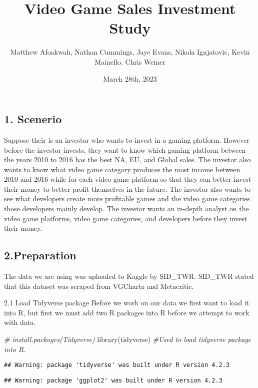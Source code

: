 \documentclass[
]{article}
\title{Video Game Sales Investment Study}
\author{Matthew Afoakwah, Nathan Cummings, Jaye Evans, Nikola
Ignjatovic, Kevin Mainello, Chris Weiner}
\date{March 28th, 2023}
\newenvironment{Shaded}{\begin{snugshade}}{\end{snugshade}}
\newcommand{\CommentTok}[1]{\textcolor[rgb]{0.56,0.35,0.01}{\textit{#1}}}
\newcommand{\FunctionTok}[1]{\textcolor[rgb]{0.00,0.00,0.00}{#1}}
\newcommand{\NormalTok}[1]{#1}
\begin{document}
\maketitle

\hypertarget{scenerio}{%
\subsection{1. Scenerio}\label{scenerio}}

Suppose their is an investor who wants to invest in a gaming platform.
However before the investor invests, they want to know which gaming
platform between the years 2010 to 2016 has the best NA, EU, and Global
sales. The investor also wants to know what video game category produces
the most income between 2010 and 2016 while for each video game platform
so that they can better invest their money to better profit themselves
in the future. The investor also wants to see what developers create
more profitable games and the video game categories those developers
mainly develop. The investor wants an in-depth analyst on the video game
platforms, video game categories, and developers before they invest
their money.

\hypertarget{preparation}{%
\subsection{2.Preparation}\label{preparation}}

The data we are using was uploaded to Kaggle by SID\_TWR. SID\_TWR
stated that this dataset was scraped from VGChartz and Metacritic.

2.1 Load Tidyverse package Before we work on our data we first want to
load it into R, but first we must add two R packages into R before we
attempt to work with data.

\begin{Shaded}
\begin{Highlighting}[]
\CommentTok{\# install.packages(\textquotesingle{}Tidyverse\textquotesingle{})}
\FunctionTok{library}\NormalTok{(tidyverse)  }\CommentTok{\#Used to load tidyverse package into R.}
\end{Highlighting}
\end{Shaded}

\begin{verbatim}
## Warning: package 'tidyverse' was built under R version 4.2.3
\end{verbatim}

\begin{verbatim}
## Warning: package 'ggplot2' was built under R version 4.2.3
\end{verbatim}
\end{document}
